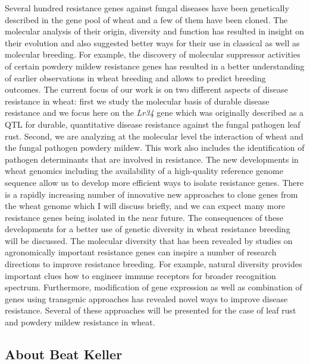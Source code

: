 \documentclass[12pt,]{book}
\theoremstyle{definition}
\theoremstyle{definition}
\theoremstyle{remark}
\begin{document}
Several hundred resistance genes against fungal diseases have been
genetically described in the gene pool of wheat and a few of them have
been cloned. The molecular analysis of their origin, diversity and
function has resulted in insight on their evolution and also suggested
better ways for their use in classical as well as molecular breeding.
For example, the discovery of molecular suppressor activities of certain
powdery mildew resistance genes has resulted in a better understanding
of earlier observations in wheat breeding and allows to predict breeding
outcomes. The current focus of our work is on two different aspects of
disease resistance in wheat: first we study the molecular basis of
durable disease resistance and we focus here on the \emph{Lr34} gene
which was originally described as a QTL for durable, quantitative
disease resistance against the fungal pathogen leaf rust. Second, we are
analyzing at the molecular level the interaction of wheat and the fungal
pathogen powdery mildew. This work also includes the identification of
pathogen determinants that are involved in resistance. The new
developments in wheat genomics including the availability of a
high-quality reference genome sequence allow us to develop more
efficient ways to isolate resistance genes. There is a rapidly
increasing number of innovative new approaches to clone genes from the
wheat genome which I will discuss briefly, and we can expect many more
resistance genes being isolated in the near future. The consequences of
these developments for a better use of genetic diversity in wheat
resistance breeding will be discussed. The molecular diversity that has
been revealed by studies on agronomically important resistance genes can
inspire a number of research directions to improve resistance breeding.
For example, natural diversity provides important clues how to engineer
immune receptors for broader recognition spectrum. Furthermore,
modification of gene expression as well as combination of genes using
transgenic approaches has revealed novel ways to improve disease
resistance. Several of these approaches will be presented for the case
of leaf rust and powdery mildew resistance in wheat.

\subsection*{About Beat Keller}\label{about-beat-keller}
\end{document}
